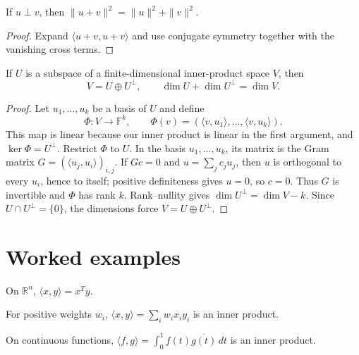 \begin{theorem}\label{thm:i13-02}
If $u\perp v$, then $\|u+v\|^2=\|u\|^2+\|v\|^2$.
\begin{proof}
Expand $\langle u+v,u+v\rangle$ and use conjugate symmetry together with the vanishing cross terms.
\end{proof}
\end{theorem}

\begin{theorem}\label{thm:i13-03}
If \(U\) is a subspace of a finite-dimensional inner-product space \(V\), then
\[
V=U\oplus U^\perp,
\qquad
\dim U+\dim U^\perp=\dim V.
\]
\begin{proof}
Let \(u_1,\ldots,u_k\) be a basis of \(U\) and define
\[
\Phi:V\to\mathbb F^k,
\qquad
\Phi(v)=(\langle v,u_1\rangle,\ldots,\langle v,u_k\rangle).
\]
This map is linear because our inner product is linear in the first argument,
and \(\ker\Phi=U^\perp\). Restrict \(\Phi\) to \(U\). In the basis
\(u_1,\ldots,u_k\), its matrix is the Gram matrix
\(G=(\langle u_j,u_i\rangle)_{i,j}\). If \(Gc=0\) and
\(u=\sum_jc_ju_j\), then \(u\) is orthogonal to every \(u_i\), hence to
itself; positive definiteness gives \(u=0\), so \(c=0\). Thus \(G\) is
invertible and \(\Phi\) has rank \(k\). Rank--nullity gives
\(\dim U^\perp=\dim V-k\). Since \(U\cap U^\perp=\{0\}\), the dimensions
force \(V=U\oplus U^\perp\).
\end{proof}
\end{theorem}

\section{Worked examples}

\begin{example}\label{ex:i13-worked-01}
On $\mathbb R^n$, $\langle x,y\rangle=x^Ty$.
\end{example}

\begin{example}\label{ex:i13-worked-02}
For positive weights $w_i$, $\langle x,y\rangle=\sum_i w_ix_iy_i$ is an inner product.
\end{example}

\begin{example}\label{ex:i13-worked-03}
On continuous functions, $\langle f,g\rangle=\int_0^1 f(t)\overline{g(t)}\,dt$ is an inner product.
\end{example}

